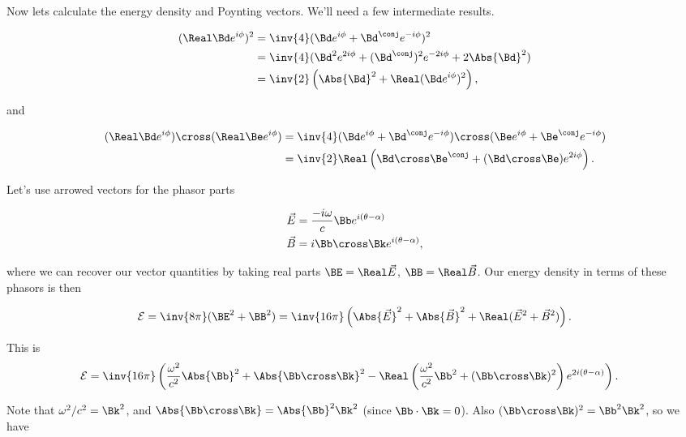 Now lets calculate the energy density and Poynting vectors.  We'll need a few intermediate results.

\begin{align*}
(\Real \Bd e^{i\phi})^2 
&= \inv{4} ( \Bd e^{i\phi} + \Bd^\conj e^{-i\phi})^2 \\
&= \inv{4} ( \Bd^2 e^{2 i \phi} + (\Bd^\conj)^2 e^{-2 i \phi} + 2 \Abs{\Bd}^2 ) \\
&= \inv{2} \left( \Abs{\Bd}^2 + \Real ( \Bd e^{i \phi} )^2 \right),
\end{align*}

and

\begin{align*}
(\Real \Bd e^{i\phi}) \cross (\Real \Be e^{i\phi}) 
&= \inv{4} 
( \Bd e^{i\phi} + \Bd^\conj e^{-i\phi}) \cross ( \Be e^{i\phi} + \Be^\conj e^{-i\phi}) \\
&= \inv{2} \Real \left( \Bd \cross \Be^\conj + (\Bd \cross \Be) e^{2 i \phi} \right).
\end{align*}

Let's use arrowed vectors for the phasor parts

\begin{align}\label{eqn:relElectroDynProblemSet4:250}
\vec{E} &= \frac{-i\omega}{c} \Bb e^{i(\theta - \alpha)} \\
\vec{B} &= i \Bb \cross \Bk e^{i(\theta - \alpha)},
\end{align}

where we can recover our vector quantities by taking real parts $\BE = \Real \vec{E}$, $\BB = \Real \vec{B}$.  Our energy density in terms of these phasors is then

\begin{equation}\label{eqn:relElectroDynProblemSet4:270}
\mathcal{E} 
= \inv{8\pi} (\BE^2 + \BB^2)
= \inv{16\pi} \left( \Abs{\vec{E}}^2 + \Abs{\vec{B}}^2 + \Real ({\vec{E}}^2 + {\vec{B}}^2) \right).
\end{equation}

This is
\begin{align*}
\mathcal{E} 
&=
\inv{16\pi}
\left(
\frac{\omega^2}{c^2} \Abs{\Bb}^2 + \Abs{\Bb \cross \Bk}^2
-\Real \left(
\frac{\omega^2}{c^2} \Bb^2 + (\Bb \cross \Bk)^2
\right)
e^{2 i(\theta - \alpha)} 
\right).
\end{align*}

Note that $\omega^2/c^2 = \Bk^2$, and $\Abs{\Bb \cross \Bk} = \Abs{\Bb}^2 \Bk^2$ (since $\Bb \cdot \Bk = 0$).  Also $(\Bb \cross \Bk)^2 = \Bb^2 \Bk^2$, so we have

